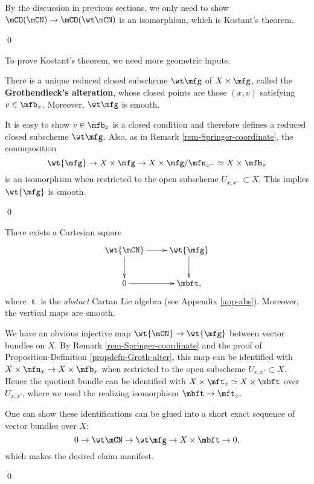 	\proof
		By the discussion in previous sections, we only need to show $\mCO(\mCN) \to \mCO(\wt\mCN)$ is an isomorphism, which is Kostant's theorem.

	\qed

	To prove Kostant's theorem, we need more geometric inputs.

	\begin{propdefn}
		\label{propdefn-Groth-alter}
		There is a unique reduced closed subscheme $\wt\mfg$ of $X\mt \mfg$, called the \textbf{Grothendieck's alteration}, whose closed points are those $(x,v)$ satisfying $v\in \mfb_x$. Moreover, $\wt\mfg$ is smooth.
	\end{propdefn}

	\proof[Sketch]
		It is easy to show $v\in \mfb_x$ is a closed condition and therefore defines a reduced closed subscheme $\wt\mfg$. Also, as in Remark \ref{rem-Springer-coordinate}, the commposition 
		\[
			\wt{\mfg} \to X\mt \mfg \to X \mt \mfg/\mfn_{x^-} \simeq X \mt \mfb_x
		\] 
		is an isomorphism when restricted to the open subscheme $U_{x,x^-}\subset X$. This implies $\wt{\mfg}$ is smooth.

	\qed



	\begin{lem}
		\label{lem-Groth-alter-Cartan}
		There exists a Cartesian square
		\[
			\xymatrix{
				\wt{\mCN} \ar[r] \ar[d] & \wt{\mfg} \ar[d] \\
				0 \ar[r] & \mbft,
			}
		\]
		where $\mbft$ is the \emph{abstact} Cartan Lie algebra (see Appendix \ref{app-abs}). Moreover, the vertical maps are smooth.

	\end{lem}

	\proof[Sketch]
		We have an obvious injective map $\wt{\mCN} \to \wt{\mfg}$ between vector bundles on $X$. By Remark \ref{rem-Springer-coordinate} and the proof of Proposition-Definition \ref{propdefn-Groth-alter}, this map can be identified with $X\mt \mfn_x \to X\mt \mfb_x $ when restricted to the open subscheme $U_{x,x'} \subset X$. Hence the quotient bundle can be identified with $X \mt \mft_x \simeq X\mt \mbft$ over $U_{x,x'}$, where we used the realizing isomorphism $\mbft \to \mft_x$.

		One can show these identifications can be glued into a short exact sequence of vector bundles over $X$:
		\[
			0 \to \wt\mCN \to \wt\mfg \to X \mt \mbft \to 0,
		\]
		which makes the desired claim manifest.

	\qed

